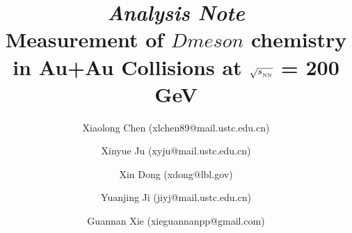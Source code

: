 \documentclass[12pt,titlepage,floatfix]{article}
\newcommand {\snn}      {\sqrt{s_{_{\rm NN}}}}
\begin{document}
\title{\emph{Analysis Note} \\ \textbf{Measurement of $Dmeson$ chemistry in Au+Au Collisions at $\snn$ = 200 GeV}}


\author[1]{Xiaolong Chen ({\color{blue}xlchen89@mail.ustc.edu.cn})}
\author[1,2]{Xinyue Ju ({\color{blue}xyju@mail.ustc.edu.cn})}
\author[2]{Xin Dong ({\color{blue}xdong@lbl.gov})}
\author[1,2]{Yuanjing Ji ({\color{blue}jiyj@mail.ustc.edu.cn})}
\author[2]{Guannan Xie ({\color{blue}xieguannanpp@gmail.com})}


\clearpage
\maketitle
\tableofcontents
\linespread{1.6}

%



\end{document}
